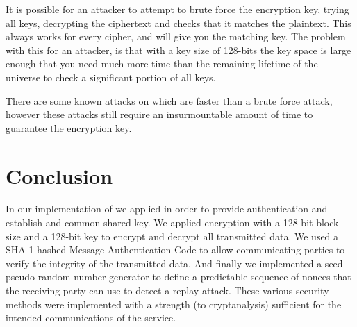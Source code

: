\documentclass[a4paper,11pt]{article}
\begin{document}
It is possible for an attacker to attempt to brute force the encryption key, 
trying all keys, decrypting the ciphertext and checks that it matches the 
plaintext. This always works for every cipher, and will give you the matching 
key. The problem with this for an attacker, is that with a key size of 128-bits 
the key space is large enough that you need much more time than the remaining 
lifetime of the universe to check a significant portion of all keys.

There are some known attacks on  which are faster than a brute
force attack, however these attacks still require an insurmountable amount of 
time to guarantee the encryption key.

\section{Conclusion}
In our implementation of \packageName{} we applied  in order to provide authentication and establish and common shared 
key. We applied  encryption with a 128-bit block size and a
128-bit key to encrypt and decrypt all transmitted data. We used a SHA-1 
hashed Message Authentication Code to allow communicating parties to verify the
integrity of the transmitted data. And finally we implemented a seed pseudo-random
number generator to define a predictable sequence of nonces that the receiving 
party can use to detect a replay attack. These various security methods were 
implemented with a strength (to cryptanalysis) sufficient for the intended 
communications of the \serviceName{} service.
\end{document}
